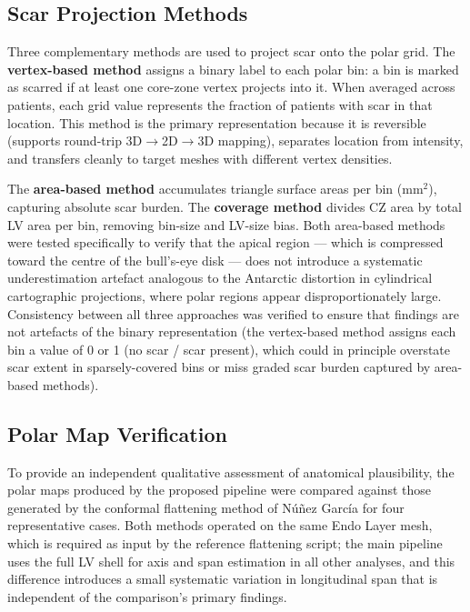 \subsection{Scar Projection Methods}

Three complementary methods are used to project scar onto the polar grid. The
\textbf{vertex-based method} assigns a binary label to each polar bin: a bin is marked as
scarred if at least one core-zone vertex projects into it. When averaged across patients, each
grid value represents the fraction of patients with scar in that location. This method is the
primary representation because it is reversible (supports round-trip 3D$\to$2D$\to$3D
mapping), separates location from intensity, and transfers cleanly to target meshes with
different vertex densities.

The \textbf{area-based method} accumulates triangle surface areas per bin (mm$^2$),
capturing absolute scar burden. The \textbf{coverage method} divides CZ area by total LV
area per bin, removing bin-size and LV-size bias. Both area-based methods were tested
specifically to verify that the apical region --- which is compressed toward the centre of the
bull's-eye disk --- does not introduce a systematic underestimation artefact analogous to
the Antarctic distortion in cylindrical cartographic projections, where polar regions appear
disproportionately large. Consistency between all three approaches was verified to ensure
that findings are not artefacts of the binary representation (the vertex-based method assigns
each bin a value of 0 or 1 (no scar / scar present), which could in principle overstate scar
extent in sparsely-covered bins or miss graded scar burden captured by area-based methods).

\subsection{Polar Map Verification}

To provide an independent qualitative assessment of anatomical plausibility, the polar maps
produced by the proposed pipeline were compared against those generated by the
conformal flattening method of N\'{u}\~{n}ez Garc\'{i}a \cite{nunez2018} for four representative cases. Both methods
operated on the same Endo Layer mesh, which is required as input by the reference
flattening script; the main pipeline uses the full LV shell for axis and span estimation in all
other analyses, and this difference introduces a small systematic variation in longitudinal
span that is independent of the comparison's primary findings.

